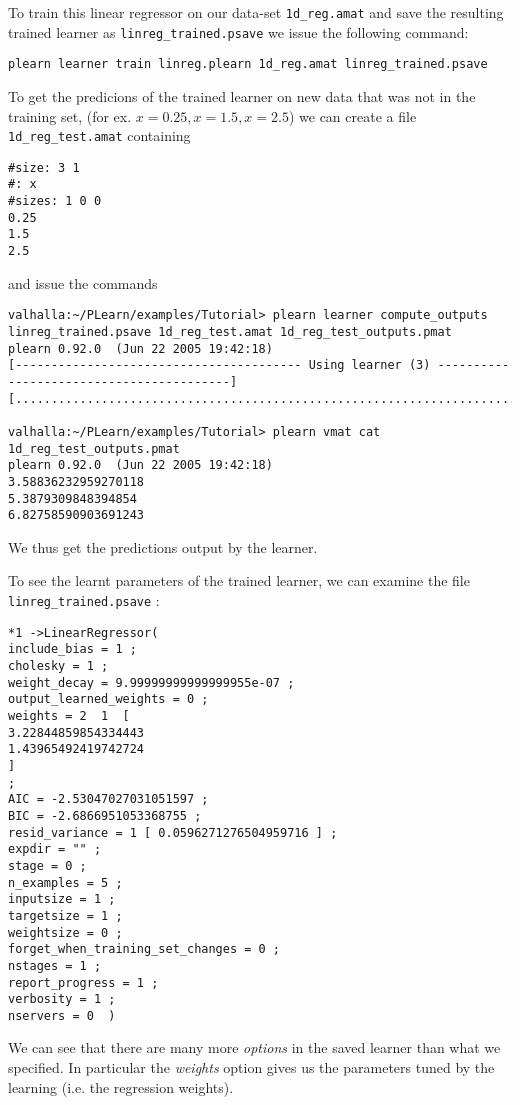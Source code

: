 \documentclass[11pt]{book}
\begin{document}
To train this linear regressor on our data-set \verb!1d_reg.amat! and save
the resulting trained learner as \verb!linreg_trained.psave! we issue the
following command:
\begin{verbatim}
plearn learner train linreg.plearn 1d_reg.amat linreg_trained.psave
\end{verbatim}

To get the predicions of the trained learner on new data that was not in
the training set, (for ex. $x=0.25, x=1.5, x=2.5$) we can create a file
\verb!1d_reg_test.amat! containing
\begin{verbatim}
#size: 3 1
#: x
#sizes: 1 0 0
0.25
1.5
2.5
\end{verbatim}

and issue the commands
\begin{verbatim}
valhalla:~/PLearn/examples/Tutorial> plearn learner compute_outputs linreg_trained.psave 1d_reg_test.amat 1d_reg_test_outputs.pmat
plearn 0.92.0  (Jun 22 2005 19:42:18)
[---------------------------------------- Using learner (3) -----------------------------------------]
[....................................................................................................]

valhalla:~/PLearn/examples/Tutorial> plearn vmat cat 1d_reg_test_outputs.pmat
plearn 0.92.0  (Jun 22 2005 19:42:18)
3.58836232959270118
5.3879309848394854
6.82758590903691243
\end{verbatim}

We thus get the predictions output by the learner.

To see the learnt parameters of the trained learner, we can examine the file \verb!linreg_trained.psave! :
\begin{verbatim}
*1 ->LinearRegressor(
include_bias = 1 ;
cholesky = 1 ;
weight_decay = 9.99999999999999955e-07 ;
output_learned_weights = 0 ;
weights = 2  1  [
3.22844859854334443
1.43965492419742724
]
;
AIC = -2.53047027031051597 ;
BIC = -2.6866951053368755 ;
resid_variance = 1 [ 0.0596271276504959716 ] ;
expdir = "" ;
stage = 0 ;
n_examples = 5 ;
inputsize = 1 ;
targetsize = 1 ;
weightsize = 0 ;
forget_when_training_set_changes = 0 ;
nstages = 1 ;
report_progress = 1 ;
verbosity = 1 ;
nservers = 0  )
\end{verbatim}

We can see that there are many more {\em options} in the saved learner than
what we specified. In particular the {\em weights} option gives us the
parameters tuned by the learning (i.e. the regression weights).
\end{document}
